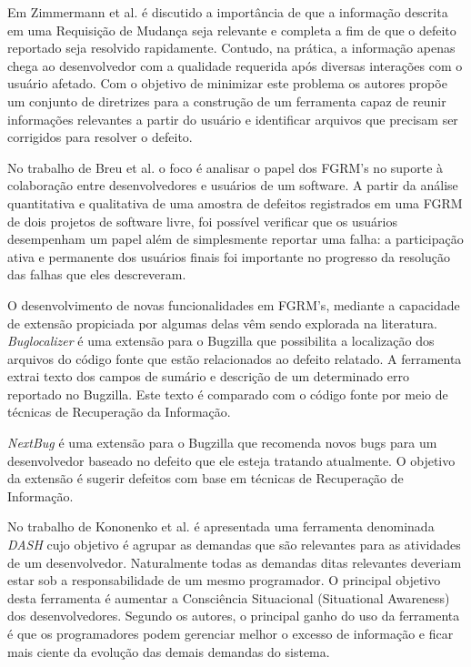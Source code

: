 \documentclass[msc]{ppgccufmg} %
\begin{document}
Em Zimmermann et al. \cite{5070993} é discutido a importância de que a informação descrita em uma Requisição de Mudança seja relevante e completa a fim de que o defeito reportado seja resolvido rapidamente. Contudo, na prática, a informação apenas chega ao desenvolvedor com a qualidade requerida após diversas interações com o usuário afetado. Com o objetivo de minimizar este
problema os autores propõe um conjunto de diretrizes para a construção de um ferramenta capaz de reunir informações relevantes a partir do usuário e identificar arquivos que precisam ser corrigidos para resolver o defeito.

No trabalho de Breu et al.\cite{Breu:2010:INB:1718918.1718973} o foco é analisar o papel dos FGRM's no suporte à colaboração entre desenvolvedores e usuários de um software. A partir da análise quantitativa e qualitativa de uma amostra de defeitos registrados em uma FGRM de dois projetos de software livre, foi possível verificar que os usuários desempenham um papel além de simplesmente reportar uma falha: a participação ativa e permanente dos usuários finais foi importante no progresso da resolução das falhas que eles descreveram.

O desenvolvimento de novas funcionalidades em FGRM's, mediante a capacidade de
extensão propiciada por algumas delas vêm sendo explorada na literatura. \textit{Buglocalizer} \cite{Thung:2014:BIT:2635868.2661678} é uma extensão para o Bugzilla que possibilita a localização dos arquivos do código fonte que estão relacionados ao defeito relatado. A ferramenta extrai texto dos campos de sumário e descrição de um determinado erro reportado no Bugzilla. Este texto é comparado com o código fonte por meio de técnicas de Recuperação da Informação.

\textit{NextBug} \cite{101186} é uma extensão para o Bugzilla que
recomenda novos bugs para um desenvolvedor baseado no defeito que ele esteja
tratando atualmente. O objetivo da extensão é sugerir defeitos com base em técnicas de
Recuperação de Informação.

No trabalho de Kononenko et al. \cite{Kononenko:2014:DED:2591062.2591075} é
apresentada uma ferramenta denominada \textit{DASH} cujo objetivo é agrupar as
demandas que são relevantes para as atividades de um desenvolvedor. Naturalmente todas as demandas ditas relevantes deveriam estar sob a responsabilidade de um mesmo programador. O principal objetivo desta ferramenta é aumentar a Consciência Situacional (Situational Awareness) dos
desenvolvedores. Segundo os autores, o principal ganho do uso da ferramenta é
que os programadores podem gerenciar melhor o excesso de informação e ficar
mais ciente da evolução das demais demandas do sistema.
\end{document}
